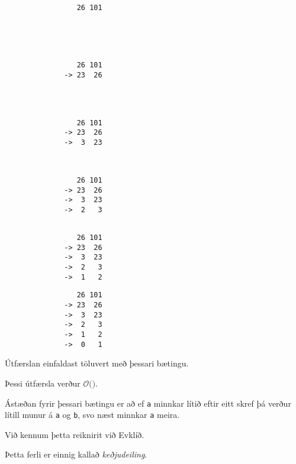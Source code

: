 { \begin{verbatim}
                 26 101





\end{verbatim}}
{ \begin{verbatim}
                 26 101
              -> 23  26




\end{verbatim}}
{ \begin{verbatim}
                 26 101
              -> 23  26
              ->  3  23



\end{verbatim}}
{ \begin{verbatim}
                 26 101
              -> 23  26
              ->  3  23
              ->  2   3


\end{verbatim}}
{ \begin{verbatim}
                 26 101
              -> 23  26
              ->  3  23
              ->  2   3
              ->  1   2

\end{verbatim}}
{ \begin{verbatim}
                 26 101
              -> 23  26
              ->  3  23
              ->  2   3
              ->  1   2
              ->  0   1
\end{verbatim}}

{
	\only<1>{\gcdA}
	\only<2>{\gcdB}
	\only<3>{\gcdC}
	\only<4>{\gcdD}
	\only<5>{\gcdE}
	\only<6>{\gcdF}
}

{
	{
		\item<1-> Útfærslan einfaldast töluvert með þessari bætingu.
		\item<2->[] 
		\item<3-> Þessi útfærsla verður $\mathcal{O}($\onslide<4->{$\log \max(a, b)$}$)$.
		\item<5-> Ástæðan fyrir þessari bætingu er að ef \texttt{a} minnkar lítið eftir eitt skref
					þá verður lítill munur á \texttt{a} og \texttt{b}, svo næst minnkar \texttt{a} meira.
		\item<6-> Við kennum þetta reiknirit við Evklíð.
		\item<7-> Þetta ferli er einnig kallað \emph{keðjudeiling}.
	}
}

